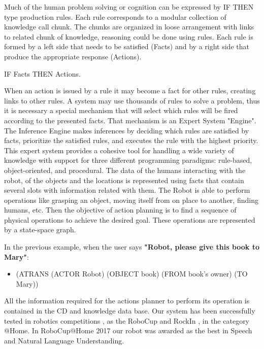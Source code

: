 \documentclass{llncs}
\begin{document}
Much of the human problem solving or cognition can be expressed by IF THEN type production rules. Each rule corresponds to a modular collection of knowledge call chunk. The chunks are organized in loose arrangement with links to related chunk of knowledge, reasoning could be done using rules. 
Each rule is formed by a left side that needs to be satisfied (Facts) and by a right side that produce the appropriate response (Actions).  
\vspace{.01 in}

		IF  Facts  THEN  Actions.
\vspace{.01 in}

When an action is issued by a rule it may become a fact for other rules, creating links to other rules. A system may use thousands of rules to solve a problem, thus it is necessary a special mechanism that will select which rules will be fired according to the presented facts. That mechanism is an Expert System "Engine".
The Inference Engine makes inferences by deciding which rules are satisfied by facts, prioritize the 
satisfied rules, and executes the rule with the highest priority.
This expert system provides a cohesive tool for handling a wide variety of knowledge with support for three different programming paradigms: rule-based, object-oriented, and procedural.
The data of the humans interacting with the robot, of the objects and the locations is represented using facts that contain several slots with information related with them.
The Robot is able to perform operations like grasping an object, moving itself from on place to another, finding humans, etc. Then the objective of action planning is to find a sequence of physical operations to achieve the desired goal.
These operations are represented by a state-space graph.

In the previous example, when the user says {\bf "Robot, please give this book to Mary"}: 
\begin{itemize}
\item []
	(ATRANS (ACTOR Robot) (OBJECT book) (FROM book's owner) (TO Mary))
\end{itemize}

All the information required for the actions planner to perform its operation is contained in the CD and knowledge data base. 
Our system has been successfully tested in robotics competitions \cite{Savage}, as the RoboCup and RockIn 
\cite{Robocup_2017}, in the category @Home.
In RoboCup@Home 2017 our robot was awarded as the best in Speech and Natural Language Understanding.
\end{document}
